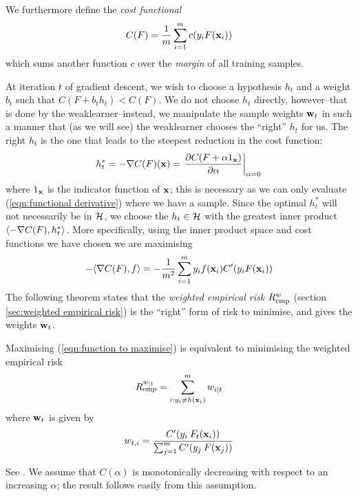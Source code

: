 We furthermore define the \emph{cost functional}
%
\begin{equation}
\label{eqn:gradient descent cost functional}
C(F) = \frac{1}{m} \sum_{i=1}^{m} c(y_i F(\mathbf{x}_i))
\end{equation}
%
which sums another function $c$ over the \emph{margin} of all training
samples.

At iteration $t$ of gradient descent, we wish to choose a hypothesis $h_t$ and
a weight $b_t$ such that $C(F + b_t h_t) < C(F)$.  We do not choose
$h_t$ directly, however--that is done by the weaklearner--instead, we
manipulate the sample weights $\mathbf{w}_t$ in such a manner that (as we
will see) the weaklearner chooses the ``right'' $h_t$ for us.  The
right $h_t$ is the one that leads to the steepest reduction in the cost
function:
%
\begin{equation}
h_t^{\ast} = -\nabla C(F)(\mathbf{x}) = \left. \frac{\partial C(F + \alpha
1_{\mathbf{x}})}{\partial \alpha} \right|_{\alpha = 0}
\label{eqn:functional derivative}
\end{equation}
%
where $1_{\mathbf{x}}$ is the indicator function of $\mathbf{x}$; this is
necessary as we can only evaluate (\ref{eqn:functional derivative})
where we have a sample.  Since the optimal $h_t^{\ast}$ will not
necessarily be in $\mathcal{H}$, we choose the $h_t \in \mathcal{H}$ with the
greatest inner product $\langle {-\nabla C(F)} , {h_t^{\ast}} \rangle$.  More
specifically, using the inner product space and cost functions we have
chosen we are maximising 
%
\begin{equation}
- \langle {\nabla C(F)} , {f} \rangle = - \frac{1}{m^2} \sum_{i=1}^{m} y_i f(\mathbf{x}_i)
  C'(y_i F(\mathbf{x}_i))
\label{eqn:function to maximise}
\end{equation}
%
The following theorem states that the \emph{weighted empirical risk}
$R_{\mathrm{emp}}^{w}$ (section \ref{sec:weighted empirical risk}) is the
``right'' form of risk to minimise, and gives the weights $\mathbf{w}_t$.

\begin{theorem}
Maximising (\ref{eqn:function to maximise}) is equivalent to
minimising the weighted empirical risk
%
\begin{equation}
R_{\mathrm{emp}}^{w_{|t}} = \sum_{i:y_i \neq h(\mathbf{x}_i)}^{m} w_{i|t}
\end{equation}
%
where $\mathbf{w}_{t}$ is given by
%
\begin{equation}
w_{t,i} = \frac{C'(y_i \: F_t (\mathbf{x}_i))}{\sum_{j=1}^{m} C'(y_j \:
F(\mathbf{x}_j))}
\label{eqn:gradient sample weights}
\end{equation}
\end{theorem}
\proof See \cite{Mason99}.  We assume that $C(\alpha)$ is
monotonically decreasing with respect to an increasing $\alpha$; the
result follows easily from this assumption.

